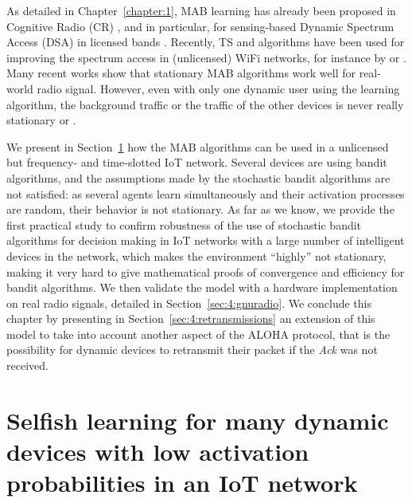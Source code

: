 As detailed in Chapter~\ref{chapter:1},
MAB learning has already been proposed in Cognitive Radio (CR) \cite{Haykin05}, and in particular, for sensing-based Dynamic Spectrum Access (DSA) in licensed bands \cite{Jouini10}.
Recently, TS and \UCB{} algorithms have been used for improving the spectrum access in (unlicensed) WiFi networks, for instance by \cite{Toldov16} or \cite{Wilhelmi19collaborative,Wilhelmi19potential}.
Many recent works show that stationary MAB algorithms work well for real-world radio signal.
However, even with only one dynamic user using the learning algorithm, the background traffic or the traffic of the other devices is never really stationary or \iid{}.

We present in Section~\ref{sec:4:firstModel} how the MAB algorithms can be used in a unlicensed but frequency- and time-slotted IoT network.
Several devices are using bandit algorithms, and the assumptions made by the stochastic bandit algorithms are not satisfied: as several agents learn simultaneously and their activation processes are random, their behavior is not stationary.
As far as we know, we provide the first practical study to confirm robustness of the use of stochastic bandit algorithms for decision making in IoT networks with a large number of intelligent devices in the network, which makes the environment ``highly'' not stationary, making it very hard to give mathematical proofs of  convergence and efficiency for bandit algorithms.
We then validate the model with a hardware implementation on real radio signals, detailed in Section~\ref{sec:4:gnuradio}.
%
We conclude this chapter by presenting in Section~\ref{sec:4:retransmissions} an extension of this model to take into account another aspect of the ALOHA protocol, that is the possibility for dynamic devices to retransmit their packet if the \emph{Ack} was not received.


\section[Selfish learning for many dynamic devices in an IoT network]{Selfish learning for many dynamic devices with low activation probabilities in an IoT network}
\label{sec:4:firstModel}

